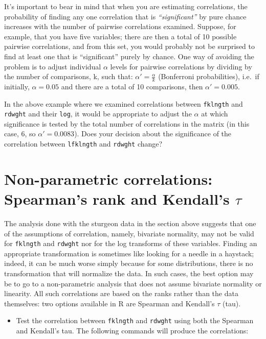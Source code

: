 \documentclass[
  12pt,
]{book}
\providecommand{\tightlist}{%
  \setlength{\itemsep}{0pt}\setlength{\parskip}{0pt}}
\begin{document}
It's important to bear in mind that when you are estimating correlations, the probability of finding any one correlation that is \emph{``significant''} by pure chance increases with the number of pairwise correlations examined. Suppose, for example, that you have five variables; there are then a total of 10 possible pairwise correlations, and from this set, you would probably not be surprised to find at least one that is ``significant'' purely by chance. One way of avoiding the problem is to adjust individual \(\alpha\) levels for pairwise correlations by dividing by the number of comparisons, k, such that: \(\alpha' = \frac{\alpha}{k}\) (Bonferroni probabilities), i.e.~if initially, \(\alpha = 0.05\) and there are a total of 10 comparisons, then \(\alpha'= 0.005\).

In the above example where we examined correlations between
\texttt{fklngth} and \texttt{rdwght} and their \texttt{log}, it would be appropriate to adjust
the \(\alpha\) at which significance is tested by the total number of
correlations in the matrix (in this case, 6, so \(\alpha'=0.0083\)). Does your
decision about the significance of the correlation between \texttt{lfklngth} and
\texttt{rdwght} change?

\hypertarget{non-parametric-correlations-spearmans-rank-and-kendalls-tau}{%
\section{\texorpdfstring{Non-parametric correlations: Spearman's rank and Kendall's \(\tau\)}{Non-parametric correlations: Spearman's rank and Kendall's \textbackslash tau}}\label{non-parametric-correlations-spearmans-rank-and-kendalls-tau}}

The analysis done with the sturgeon data in the section above suggests that one of the assumptions of correlation, namely, bivariate normality, may not be valid for \texttt{fklngth} and \texttt{rdwght} nor for the log transforms of these variables. Finding an appropriate transformation is sometimes like looking for a needle in a haystack; indeed, it can be much worse simply because for some distributions, there is no transformation that will normalize the data. In such cases, the best option may be to go to a non-parametric analysis that does not assume bivariate normality or linearity. All such correlations are based on the ranks rather than the data themselves: two options available in
R are Spearman and Kendall's \(\tau\) (tau).

\begin{itemize}
\tightlist
\item
  Test the correlation between \texttt{fklngth} and \texttt{rdwght} using both the Spearman and Kendall's tau. The following commands will produce the correlations:
\end{itemize}
\end{document}
